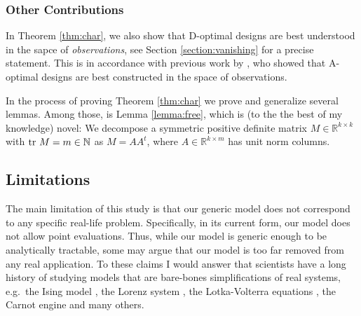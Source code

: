 \subsubsection{Other Contributions}
In Theorem \ref{thm:char}, we also show that D-optimal designs are
best understood in the sapce of \emph{observations}, see Section
\ref{section:vanishing} for a precise statement. This is in accordance
with previous work by \cite{koval2020}, who showed that A-optimal
designs are best constructed in the space of observations.

In the process of proving Theorem \ref{thm:char} we prove and
generalize several lemmas. Among those, is Lemma \ref{lemma:free},
which is (to the the best of my knowledge) novel: We decompose a
symmetric positive definite matrix \(M \in \mathbb{R}^{k \times k}\)
with \(\textup{tr}\ M = m \in \mathbb{N}\) as \(M = AA^t\), where \(A\in
\mathbb{R}^{k \times m}\) has unit norm columns.




\subsection{Limitations}\label{subsec:limitations}
The main limitation of this study is that our generic model does not
correspond to any specific real-life problem. Specifically, in its
current form, our model does not allow point evaluations. Thus, while
our model is generic enough to be analytically tractable, some may
argue that our model is too far removed from any real application. To
these claims I would answer that scientists have a long history of
studying models that are bare-bones simplifications of real systems,
e.g.~the Ising model \cite{cipra1987}, the Lorenz system \cite{brin},
the Lotka-Volterra equations \cite{logan2006}, the Carnot engine
\cite{kardar2007} and many others.
